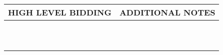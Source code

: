 \documentclass{article}
\begin{document}
\noindent
\begin{tabular}{| p{139.1mm} | p{139.1mm} |}
	\cellcolor[gray]{0.9} \textbf{HIGH LEVEL BIDDING} & \cellcolor[gray]{0.9} \textbf{ADDITIONAL NOTES} \\ \hline
	& \\ \hline
	& \\ \hline
	& \\ \hline
	& \\ \hline
	& \\ \hline
	& \\ \hline
	& \\ \hline
	& \\ \hline
	& \\ \hline
	& \\ \hline
\end{tabular}
\end{document}
